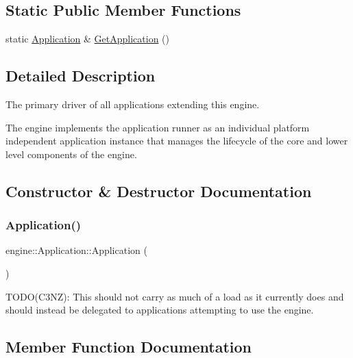 \subsection*{Static Public Member Functions}
\begin{DoxyCompactItemize}
\item 
static \hyperlink{classengine_1_1Application}{Application} \& \hyperlink{classengine_1_1Application_a639cdab87d3c5a14d0a9e9203d6c7c97}{Get\+Application} ()
\end{DoxyCompactItemize}


\subsection{Detailed Description}
The primary driver of all applications extending this engine. 

The engine implements the application runner as an individual platform independent application instance that manages the lifecycle of the core and lower level components of the engine. 

\subsection{Constructor \& Destructor Documentation}
\mbox{\label{classengine_1_1Application_a9740cd2e55318cbc5684a6c4c2f3304f}} 
\subsubsection{\texorpdfstring{Application()}{Application()}}
{\footnotesize\ttfamily engine\+::\+Application\+::\+Application (\begin{DoxyParamCaption}{ }\end{DoxyParamCaption})}

T\+O\+D\+O(\+C3\+N\+Z)\+: This should not carry as much of a load as it currently does and should instead be delegated to applications attempting to use the engine. 

\subsection{Member Function Documentation}
\mbox{\label{classengine_1_1Application_a639cdab87d3c5a14d0a9e9203d6c7c97}} 
